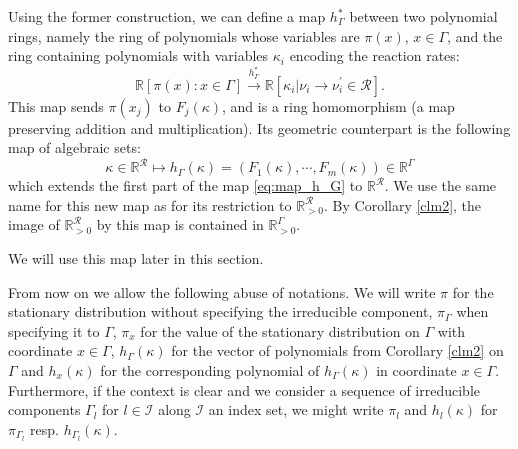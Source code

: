 \documentclass{amsart}
\theoremstyle{definition}
\theoremstyle{remark}
\theoremstyle{Conjecture/open problem}
\theoremstyle{assumption}
\theoremstyle{conjecture}
\def\I{\mathcal{I}}
\def\Ga{\Gamma}
\def\p{^{\prime}}
\def\k{\kappa}
\def\cR{\mathcal{R}}
\def\R{\mathbb{R}}
\numberwithin{equation}{section}
\begin{document}
Using the former construction, we can define a map $h_{\Gamma}^*$ between two polynomial rings, namely the ring of polynomials whose variables are $\pi (x)$, $x\in \Gamma$, and the ring containing polynomials with variables $\k _i$ encoding the reaction rates:
$$\mathbb{R}[\pi (x):x\in \Gamma]\stackrel{h_{\Gamma }^*}{\longrightarrow}\mathbb{R}[\k_i|{\nu_i\to\nu_i\p}\in\cR].$$  
This map sends $\pi(x_j)$ to $F_j(\k)$, and is a ring homomorphism (a map preserving addition and multiplication). Its geometric counterpart is the following map of algebraic sets:
$$\k\in \R^\cR\longmapsto h_{\Gamma }(\k)=(F_1(\k),\cdots,F_m(\k))\in \R^\Ga$$
 which extends the first part of the map \eqref{eq:map_h_G} to $\R^\cR$. We use the same name for this new map as for its restriction to $\R^\cR_{>0}$. By Corollary \ref{clm2}, the image of $\R_{>0}^\cR$ by this map is contained in $\R_{>0}^\Ga$.

  We will use this map later in this section.



\vspace{0.2cm}




From now on we allow the following abuse of notations. We will write $\pi$ for the stationary distribution without specifying the irreducible component, $\pi_\Ga$ when specifying it to $\Ga$, $\pi_x$ for the value of the stationary distribution on $\Ga$ with coordinate $x\in \Ga$, $h_\Ga(\k)$ for the vector of polynomials from Corollary \ref{clm2} on $\Ga$ and $h_x(\k)$ for the corresponding polynomial of $h_\Ga(\k)$ in coordinate $x\in \Ga$. Furthermore, if the context is clear and we consider a sequence of irreducible components $\Ga_l$ for $l\in \I$ along $\I$ an index set, we might write $\pi_l$ and $h_l(\k)$ for $\pi_{\Ga_l}$ resp. $h_{\Ga_l}(\k)$. 
\end{document}

